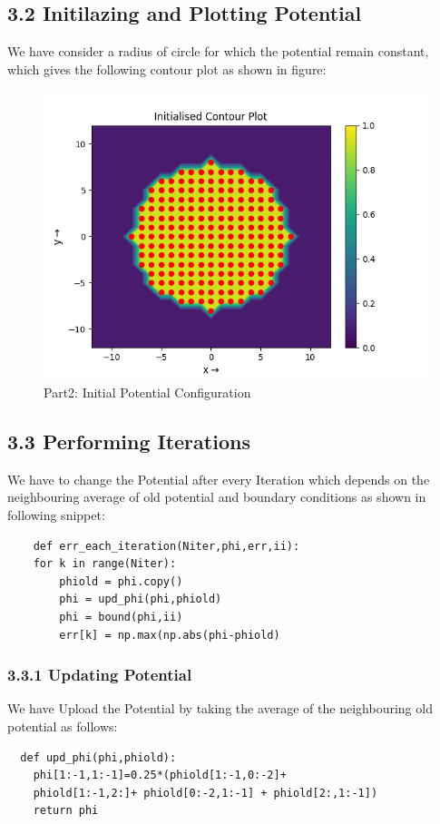 \documentclass[12pt, a4paper]{report}
\begin{document}
 \subsection*{3.2 Initilazing and Plotting Potential}
  We have consider a radius of circle for which the potential remain constant, which gives the following contour plot as shown in figure:
  \begin{figure}[H]
	\centering
	\includegraphics[scale=0.8]{Figure_1.png} 
	\caption{Part2: Initial Potential Configuration}
	\label{fig:1}
  \end{figure}
  
 \subsection*{3.3 Performing Iterations}
 We have to change the Potential after every Iteration which depends on the neighbouring average of old potential and boundary conditions as shown in following snippet:
 \begin{verbatim}
    def err_each_iteration(Niter,phi,err,ii):
    for k in range(Niter):
        phiold = phi.copy()
        phi = upd_phi(phi,phiold)
        phi = bound(phi,ii)
        err[k] = np.max(np.abs(phi-phiold)                                   
  \end{verbatim}
  
  \subsubsection*{3.3.1 Updating Potential}
  We have Upload the Potential by taking the average of the neighbouring old potential as follows:
  \begin{verbatim}
  def upd_phi(phi,phiold):
    phi[1:-1,1:-1]=0.25*(phiold[1:-1,0:-2]+
    phiold[1:-1,2:]+ phiold[0:-2,1:-1] + phiold[2:,1:-1])
    return phi
  \end{verbatim}
  
\end{document}
